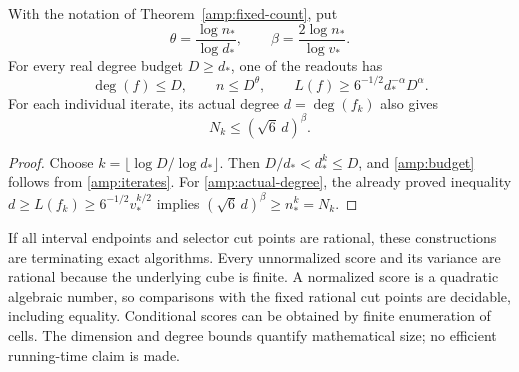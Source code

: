 \begin{corollary}
\label{amp:dimension}
With the notation of Theorem~\ref{amp:fixed-count}, put
\[
 \theta=\frac{\log n_*}{\log d_*},\qquad
 \beta=\frac{2\log n_*}{\log v_*}.
\]
For every real degree budget $D\ge d_*$, one of the readouts has
\begin{equation}
 \deg(f)\le D,\qquad n\le D^\theta,\qquad
 L(f)\ge6^{-1/2}d_*^{-\alpha}D^\alpha.
 \label{amp:budget}
\end{equation}
For each individual iterate, its actual degree $d=\deg(f_k)$ also gives
\begin{equation}
 N_k\le(\sqrt6\,d)^\beta.
 \label{amp:actual-degree}
\end{equation}
\end{corollary}

\begin{proof}
Choose $k=\lfloor\log D/\log d_*\rfloor$.  Then
$D/d_*<d_*^k\le D$, and \eqref{amp:budget} follows from
\eqref{amp:iterates}.  For \eqref{amp:actual-degree}, the already
proved inequality
$d\ge L(f_k)\ge6^{-1/2}v_*^{k/2}$ implies
$(\sqrt6\,d)^\beta\ge n_*^k=N_k$.
\end{proof}

If all interval endpoints and selector cut points are rational, these
constructions are terminating exact algorithms.  Every unnormalized score
and its variance are rational because the underlying cube is finite.  A
normalized score is a quadratic algebraic number, so comparisons with the
fixed rational cut points are decidable, including equality.  Conditional
scores can be obtained by finite enumeration of cells.  The dimension and
degree bounds quantify mathematical size; no efficient running-time claim
is made.
